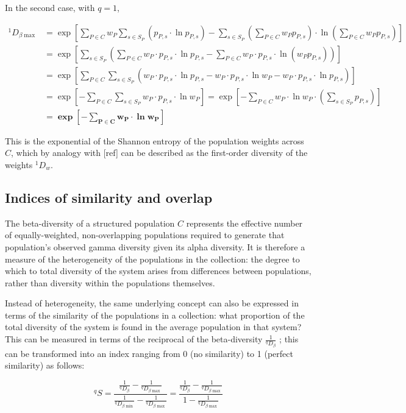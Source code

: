 In the second case, with $q = 1$,

\begin{equation}\begin{split}
^1D_{\beta\max}
& = \exp\left[\sum_{P \in C}w_P\sum_{s \in S_P}(p_{P,s}\cdot\ln p_{P,s})-\sum_{s \in S_P}\left(\sum_{P \in C}w_Pp_{P,s}\right)\cdot\ln \left(\sum_{P \in C}w_Pp_{P,s}\right)\right]\\
& = \exp\left[\sum_{s \in S_P}\left(\sum_{P \in C}w_P \cdot p_{P,s}\cdot\ln p_{P,s} - \sum_{P \in C} w_P \cdot p_{P,s} \cdot\ln \left(w_Pp_{P,s}\right)\right)\right]\\
& = \exp\left[\sum_{P \in C}\sum_{s \in S_P}\left(w_P \cdot p_{P,s}\cdot\ln p_{P,s} - w_P \cdot p_{P,s} \cdot\ln w_P - w_P \cdot p_{P,s} \cdot\ln p_{P,s}\right)\right]\\
& = \exp\left[-\sum_{P \in C}\sum_{s \in S_P} w_P \cdot p_{P,s} \cdot \ln w_P \right]
 = \exp\left[-\sum_{P \in C} w_P \cdot \ln w_P \cdot \left(\sum_{s \in S_P} p_{P,s}\right)\right]\\
& = \boldsymbol{\exp\left[-\sum_{P \in C} w_P \cdot \ln w_P \right]}
\end{split}
\label{eq:diversity_beta_q1}
\end{equation} %

This is the exponential of the Shannon entropy of the population weights across $C$, which by analogy with [ref] can be described as the first-order diversity of the weights $^1D_w$.

\subsection{Indices of similarity and overlap}

The beta-diversity of a structured population $C$ represents the effective number of equally-weighted, non-overlapping populations required to generate that population's observed gamma diversity given its alpha diversity. It is therefore a measure of the heterogeneity of the populations in the collection: the degree to which to total diversity of the system arises from differences between populations, rather than diversity within the populations themselves. 

Instead of heterogeneity, the same underlying concept can also be expressed in terms of the similarity of the populations in a collection: what proportion of the total diversity of the system is found in the average population in that system? This can be measured in terms of the reciprocal of the beta-diversity $\frac{1}{^qD_\beta}$ \citep{jost2007partitioning}; this can be transformed into an index ranging from 0 (no similarity) to 1 (perfect similarity) as follows:

\begin{equation}
^qS 
= \frac{\displaystyle\frac{1}{^qD_\beta} - \frac{1}{^qD_{\beta\max}}}{\displaystyle\frac{1}{^qD_{\beta\min}} - \frac{1}{^qD_{\beta\max}}}
= \frac{\displaystyle\frac{1}{^qD_\beta} - \frac{1}{^qD_{\beta\max}}}{\displaystyle1 - \frac{1}{^qD_{\beta\max}}}
\end{equation}

